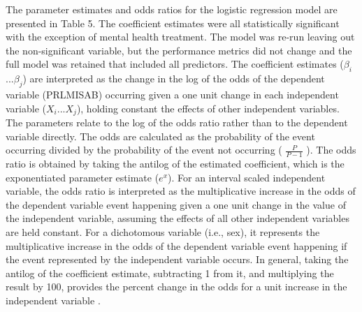 \documentclass[sigconf]{acmart}
\begin{document}
The parameter estimates and odds ratios for the logistic regression model 
are presented in Table 5. The coefficient estimates were all statistically 
significant with the exception of mental health treatment. The model was 
re-run leaving out the non-significant variable, but the performance metrics 
did not change and the full model was retained that included all predictors. 
The coefficient estimates ($\beta_i$...$\beta_j$) are interpreted as the 
change in the log of the odds of the dependent variable (PRLMISAB) occurring 
given a one unit change in each independent variable ($X_i$...$X_j$), holding
constant the effects of other independent variables. The parameters relate to 
the log of the odds ratio rather than to the dependent variable directly. 
The odds are calculated as the probability of the event occurring divided 
by the probability of the event not occurring ( \(\frac{P}{P-1}\) ). The 
odds ratio is obtained by taking the antilog of the estimated coefficient, 
which is the exponentiated parameter estimate ($e^x$). For an interval scaled 
independent variable, the odds ratio is interpreted as the multiplicative 
increase in the odds of the dependent variable event happening given a 
one unit change in the value of the independent variable, assuming the 
effects of all other independent variables are held constant. For a 
dichotomous variable (i.e., sex), it represents the multiplicative increase 
in the odds of the dependent variable event happening if the event
represented by the independent variable occurs. In general, taking the 
antilog of the coefficient estimate, subtracting 1 from it, and multiplying 
the result by 100, provides the percent change in the odds for a unit 
increase in the independent variable  \cite{gujarati09}.  

\end{document}

